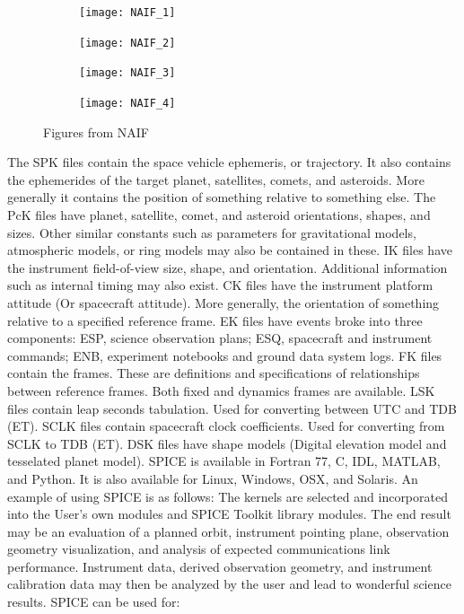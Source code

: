 \documentclass[crop=false,class=book]{standalone}
\begin{document}
\begin{figure}[H]
	\centering
	\begin{subfigure}[b]{0.49\textwidth}
	    \texttt{[image: NAIF\_1]}
    \end{subfigure}
    \begin{subfigure}[b]{0.49\textwidth}
        \texttt{[image: NAIF\_2]}
    \end{subfigure}
	\begin{subfigure}[b]{0.49\textwidth}
	    \texttt{[image: NAIF\_3]}
    \end{subfigure}
    \begin{subfigure}[b]{0.49\textwidth}
        \texttt{[image: NAIF\_4]}
    \end{subfigure}
        \caption{Figures from NAIF}
        \label{fig:first_naif_image_more_stuff_4}
\end{figure}
The SPK files contain the space vehicle ephemeris, or trajectory. It also contains the ephemerides of the target planet, satellites, comets, and asteroids. More generally it contains the position of something relative to something else. The PcK files have planet, satellite, comet, and asteroid orientations, shapes, and sizes. Other similar constants such as parameters for gravitational models, atmospheric models, or ring models may also be contained in these. IK files have the instrument field-of-view size, shape, and orientation. Additional information such as internal timing may also exist. CK files have the instrument platform attitude (Or spacecraft attitude). More generally, the orientation of something relative to a specified reference frame. EK files have events broke into three components: ESP, science observation plans; ESQ, spacecraft and instrument commands; ENB, experiment notebooks and ground data system logs. FK files contain the frames. These are definitions and specifications of relationships between reference frames. Both fixed and dynamics frames are available. LSK files contain leap seconds tabulation. Used for converting between UTC and TDB (ET). SCLK files contain spacecraft clock coefficients. Used for converting from SCLK to TDB (ET). DSK files have shape models (Digital elevation model and tesselated planet model). SPICE is available in Fortran 77, C, IDL, MATLAB, and Python. It is also available for Linux, Windows, OSX, and Solaris. An example of using SPICE is as follows: The kernels are selected and incorporated into the User's own modules and SPICE Toolkit library modules. The end result may be an evaluation of a planned orbit, instrument pointing plane, observation geometry visualization, and analysis of expected communications link performance. Instrument data, derived observation geometry, and instrument calibration data may then be analyzed by the user and lead to wonderful science results. SPICE can be used for:
\end{document}
